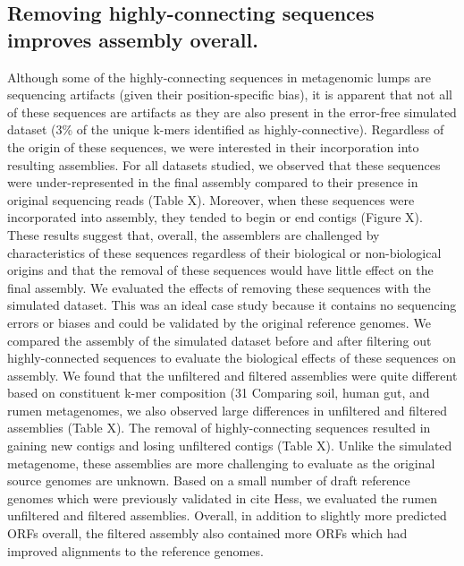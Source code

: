 \documentclass[11pt]{article} %
\begin{document}
\subsection{Removing highly-connecting sequences improves assembly overall.}
Although some of the highly-connecting sequences in metagenomic lumps are sequencing artifacts (given their position-specific bias), it is apparent that not all of these sequences are artifacts as they are also present in the error-free simulated dataset (3\% of the unique k-mers identified as highly-connective). Regardless of the origin of these sequences, we were interested in their incorporation into resulting assemblies.  For all datasets studied, we observed that these sequences were under-represented in the final assembly compared to their presence in original sequencing reads (Table X).  Moreover, when these sequences were incorporated into assembly, they tended to begin or end contigs (Figure X).  These results suggest that, overall, the assemblers are challenged by characteristics of these sequences regardless of their biological or non-biological origins and that the removal of these sequences would have little effect on the final assembly. 
	We evaluated the effects of removing these sequences with the simulated dataset.  This was an ideal case study because it contains no sequencing errors or biases and could be validated by the original reference genomes.  We compared the assembly of the simulated dataset before and after filtering out highly-connected sequences to evaluate the biological effects of these sequences on assembly.  We found that the unfiltered and filtered assemblies were quite different based on constituent k-mer composition (31%
	Comparing soil, human gut, and rumen metagenomes, we also observed large differences in unfiltered and filtered assemblies (Table X).  The removal of highly-connecting sequences resulted in gaining new contigs and losing unfiltered contigs (Table X).  Unlike the simulated metagenome, these assemblies are more challenging to evaluate as the original source genomes are unknown.  Based on a small number of draft reference genomes which were previously validated in cite Hess, we evaluated the rumen unfiltered and filtered assemblies.  Overall, in addition to slightly more predicted ORFs overall, the filtered assembly also contained more ORFs which had improved alignments to the reference genomes.  
	
\end{document}
